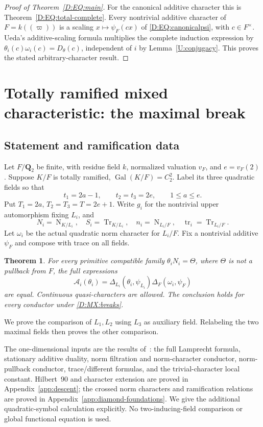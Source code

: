 \documentclass[11pt]{amsart}
\newtheorem{theorem}{Theorem}[section]
\theoremstyle{definition}
\theoremstyle{remark}
\newcommand{\Tr}{\operatorname{Tr}}
\newcommand{\Nm}{\operatorname{N}}
\newcommand{\Gal}{\operatorname{Gal}}
\begin{document}
\begin{proof}[Proof of Theorem~\ref{D:EQ:main}]
For the canonical additive character this is Theorem~\ref{D:EQ:total-complete}.
Every nontrivial additive character of $F=k((\varpi))$ is a scaling
$x\mapsto\psi_F(cx)$ of \eqref{D:EQ:canonicalpsi}, with $c\in F^\times$.
Ueda's additive-scaling formula multiplies the complete induction
expression by $\theta_i(c)\omega_i(c)=D_\theta(c)$, independent of $i$
by Lemma~\ref{U:conjugacy}. This proves the stated arbitrary-character result.
\end{proof}


\section{Totally ramified mixed characteristic: the maximal break}\label{sec:dyadic-maximal}
\subsection{Statement and ramification data}
Let $F/\mathbf Q_2$ be finite, with residue field $k$, normalized
valuation $v_F$, and $e=v_F(2)$. Suppose $K/F$ is totally ramified,
$\Gal(K/F)=C_2^2$. Label its three quadratic fields so that
\begin{equation}\label{D:MX:breaks}
 t_1=2a-1,\qquad t_2=t_3=2e,\qquad 1\le a\le e.
\end{equation}
Put $T_1=2a$, $T_2=T_3=T=2e+1$. Write $g_i$ for the nontrivial
upper automorphism fixing $L_i$, and
\[
 N_i=\Nm_{K/L_i},\quad S_i=\Tr_{K/L_i},\quad
 n_i=\Nm_{L_i/F},\quad \operatorname{tr}_i=\Tr_{L_i/F}.
\]
Let $\omega_i$ be the actual quadratic norm character for $L_i/F$.
Fix a nontrivial additive $\psi_F$ and compose with trace on all fields.
\begin{theorem}\label{D:MX:main}
For every primitive compatible family $\theta_iN_i=\Theta$,
where $\Theta$ is not a pullback from $F$, the full expressions
\begin{equation}\label{D:MX:target}
 \mathcal A_i(\theta_i)=
 \Delta_{L_i}(\theta_i,\psi_{L_i})\Delta_F(\omega_i,\psi_F)
\end{equation}
are equal. Continuous quasi-characters are allowed. The conclusion
holds for every conductor under \eqref{D:MX:breaks}.
\end{theorem}
We prove the comparison of $L_1,L_2$ using $L_3$ as auxiliary field.
Relabeling the two maximal fields then proves the other comparison.

The one-dimensional inputs are the results of~\cite{Ueda}: the full Lamprecht formula,
stationary additive duality, norm filtration and norm-character conductor,
norm-pullback conductor, trace/different formulas, and the trivial-character
local constant. Hilbert~90 and character extension are proved in
Appendix~\ref{app:descent}; the crossed norm characters and ramification
relations are proved in Appendix~\ref{app:diamond-foundations}.
We give the additional quadratic-symbol calculation explicitly.
No two-inducing-field comparison or global functional equation is used.
\end{document}
